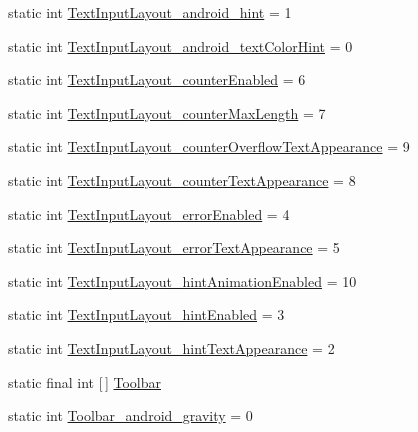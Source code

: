 \begin{DoxyCompactItemize}
static int \hyperlink{classandroid_1_1support_1_1v7_1_1appcompat_1_1R_1_1styleable_abb324015c1082661e99107047389570c}{Text\+Input\+Layout\+\_\+android\+\_\+hint} = 1
\item 
static int \hyperlink{classandroid_1_1support_1_1v7_1_1appcompat_1_1R_1_1styleable_aee5a3e884d476f02f2abe67a3dfa0593}{Text\+Input\+Layout\+\_\+android\+\_\+text\+Color\+Hint} = 0
\item 
static int \hyperlink{classandroid_1_1support_1_1v7_1_1appcompat_1_1R_1_1styleable_ac54647cf8e894dfd152943e336c01486}{Text\+Input\+Layout\+\_\+counter\+Enabled} = 6
\item 
static int \hyperlink{classandroid_1_1support_1_1v7_1_1appcompat_1_1R_1_1styleable_a793c82374695417c1f4d0a1417cbcacc}{Text\+Input\+Layout\+\_\+counter\+Max\+Length} = 7
\item 
static int \hyperlink{classandroid_1_1support_1_1v7_1_1appcompat_1_1R_1_1styleable_af52e4bb48c3468ccf7ac636439c45789}{Text\+Input\+Layout\+\_\+counter\+Overflow\+Text\+Appearance} = 9
\item 
static int \hyperlink{classandroid_1_1support_1_1v7_1_1appcompat_1_1R_1_1styleable_afb345d2fd2db6ca23ec4772a9051c0e5}{Text\+Input\+Layout\+\_\+counter\+Text\+Appearance} = 8
\item 
static int \hyperlink{classandroid_1_1support_1_1v7_1_1appcompat_1_1R_1_1styleable_abce6bca775196b0f23b9f0f81ac9bd70}{Text\+Input\+Layout\+\_\+error\+Enabled} = 4
\item 
static int \hyperlink{classandroid_1_1support_1_1v7_1_1appcompat_1_1R_1_1styleable_a061ba991b6d0e7f4f5d12421d1455f6d}{Text\+Input\+Layout\+\_\+error\+Text\+Appearance} = 5
\item 
static int \hyperlink{classandroid_1_1support_1_1v7_1_1appcompat_1_1R_1_1styleable_a251daf99133a0fb31843185d95f33d0d}{Text\+Input\+Layout\+\_\+hint\+Animation\+Enabled} = 10
\item 
static int \hyperlink{classandroid_1_1support_1_1v7_1_1appcompat_1_1R_1_1styleable_a20426c1cbc9060134282fe9a4c3a60dc}{Text\+Input\+Layout\+\_\+hint\+Enabled} = 3
\item 
static int \hyperlink{classandroid_1_1support_1_1v7_1_1appcompat_1_1R_1_1styleable_a49690b12689de9f06e6a52752ca6f259}{Text\+Input\+Layout\+\_\+hint\+Text\+Appearance} = 2
\item 
static final int \mbox{[}$\,$\mbox{]} \hyperlink{classandroid_1_1support_1_1v7_1_1appcompat_1_1R_1_1styleable_a2daba9587ef9f700f2d54cf13435cb32}{Toolbar}
\item 
static int \hyperlink{classandroid_1_1support_1_1v7_1_1appcompat_1_1R_1_1styleable_a0b7088280f7c520251692daae225c6af}{Toolbar\+\_\+android\+\_\+gravity} = 0

\end{DoxyCompactItemize}
